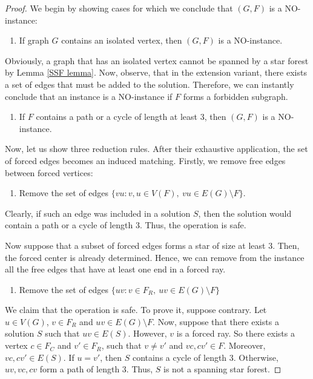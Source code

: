\documentclass[en]{pracamgr}
\theoremstyle{definition}
\begin{document}
\begin{proof}
	We begin by showing cases for which we conclude that $(G,F)$ is a NO-instance:
	\begin{enumerate}[leftmargin=*,label=\textbf{Reduction \arabic{enumi}},labelindent=0pt]
		\item If graph $G$ contains an isolated vertex, then $(G,F)$ is a NO-instance.
	\end{enumerate}
	
	Obviously, a graph that has an isolated vertex cannot be spanned by a star forest by Lemma \ref{SSF lemma}. Now, observe, that in the extension variant, there exists a set of edges that must be added to the solution. Therefore, we can instantly conclude that an instance is a NO-instance if $F$ forms a forbidden subgraph.
	
	\begin{enumerate}[leftmargin=*,label=\textbf{Reduction \arabic{enumi}},labelindent=0pt,resume]
		\item If $F$ contains a path or a cycle of length at least $3$, then $(G,F)$ is a NO-instance.
	\end{enumerate}
	
	Now, let us show three reduction rules. After their exhaustive application, the set of forced edges becomes an induced matching. Firstly, we remove free edges between forced vertices:	

	\begin{enumerate}[leftmargin=*,label=\textbf{Reduction \arabic{enumi}},labelindent=0pt,resume]
		\item Remove the set of edges $\{vu: v,u \in V(F),\ vu \in E(G) \setminus F\}$.
	\end{enumerate}
	Clearly, if such an edge was included in a solution $S$, then the solution would contain a path or a cycle of length $3$. Thus, the operation is safe. 
	
	Now suppose that a subset of forced edges forms a star of size at least $3$. Then, the forced center is already determined. Hence, we can remove from the instance all the free edges that have at least one end in a forced ray. 
	
	\begin{enumerate}[leftmargin=*,label=\textbf{Reduction \arabic{enumi}},resume,wide, labelwidth=!, labelindent=0pt]
		\item Remove the set of edges $\{uv: v \in F_R,\ uv \in E(G) \setminus F\}$
	\end{enumerate}
	We claim that the operation is safe. To prove it, suppose contrary. Let $u \in V(G)$, $v \in F_R$ and $uv \in E(G) \setminus F$. Now, suppose that there exists a solution $S$ such that $uv \in E(S)$. However, $v$ is a forced ray. So there exists a vertex $c \in F_C$ and $v' \in F_R$, such that $v \neq v'$ and $vc,cv' \in F$. Moreover, $vc,cv' \in E(S)$. If $u=v'$, then $S$ contains a cycle of length $3$. Otherwise, $uv,vc,cv$ form a path of length $3$. Thus, $S$ is not a spanning star forest.


\end{proof}
\end{document}
